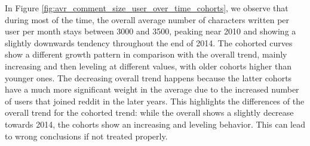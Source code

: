 
In Figure \ref{fig:avr_comment_size_user_over_time_cohorts}, we observe that during most of the time, the overall average number of characters written per user per month stays between 3000 and 3500, peaking near 2010 and showing a slightly downwards tendency throughout the end of 2014. The cohorted curves show a different growth pattern in comparison with the overall trend, mainly increasing and then leveling at different values, with older cohorts higher than younger ones. The decreasing overall trend happens because the latter cohorts have a much more significant weight in the average due to the increased number of users that joined reddit in the later years. This highlights the differences of the overall trend for the cohorted trend: while the overall shows a slightly decrease towards 2014, the cohorts show an increasing and leveling behavior. This can lead to wrong conclusions if not treated properly.


